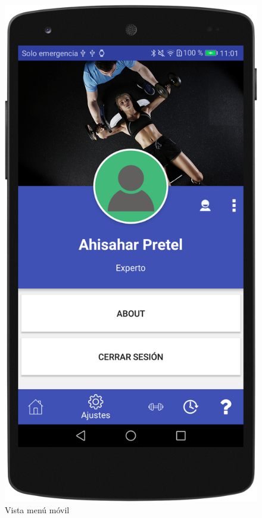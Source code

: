 \begin{figure}[H]
	\centering
	\includegraphics[scale=0.10]{imagenes/m3.png}
	\caption{Vista menú móvil}
	\label{Vista menú movil}
\end{figure}

